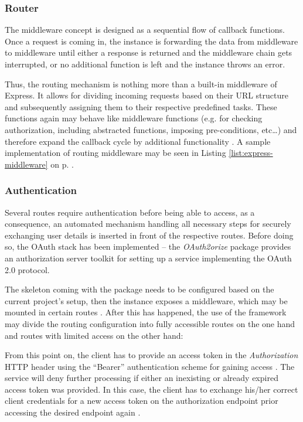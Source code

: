 \subsubsection{Router}
The middleware concept is designed as a sequential flow of callback functions. Once a request is coming in, the instance is forwarding the data from middleware to middleware until either a response is returned and the middleware chain gets interrupted, or no additional function is left and the instance throws an error.

Thus, the routing mechanism is nothing more than a built-in middleware of Express. It allows for dividing incoming requests based on their URL structure and subsequently assigning them to their respective predefined tasks. These functions again may behave like middleware functions (e.g. for checking authorization, including abstracted functions, imposing pre-conditions, etc\ldots) and therefore expand the callback cycle by additional functionality \cite{ExpressRouter}. A sample implementation of routing middleware may be seen in Listing \ref{list:express-middleware} on p. \pageref{list:express-middleware}.

\subsubsection{Authentication}
Several routes require authentication before being able to access, as a consequence, an automated mechanism handling all necessary steps for securely exchanging user details is inserted in front of the respective routes. Before doing so, the OAuth stack has been implemented -- the \emph{OAuth2orize} package provides an authorization server toolkit for setting up a service implementing the OAuth 2.0 protocol.

The skeleton coming with the package needs to be configured based on the current project's setup, then the instance exposes a middleware, which may be mounted in certain routes \cite{OAuth2orizeGitHub}. After this has happened, the use of the framework may divide the routing configuration into fully accessible routes on the one hand and routes with limited access on the other hand:



From this point on, the client has to provide an access token in the \emph{Authorization} HTTP header using the ``Bearer'' authentication scheme for gaining access \cite[5]{RFC6750}. The service will deny further processing if either an inexisting or already expired access token was provided. In this case, the client has to exchange his/her correct client credentials for a new access token on the authorization endpoint prior accessing the desired endpoint again \cite[41]{hardt2012oauth}.
